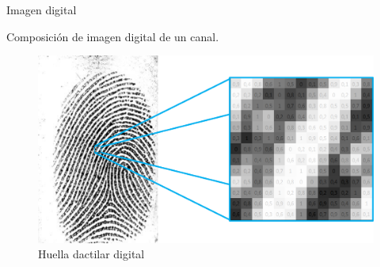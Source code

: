 \documentclass[12pt,aspectratio=169]{beamer}
\begin{document}
\begin{frame}{Imagen digital}

    Composición de imagen digital de un canal.

    \begin{figure}
        \includegraphics[scale=0.45]{figs/huella_pixeles_numeros.png}
        \caption{Huella dactilar digital}
    \end{figure}

\end{frame}
\end{document}
